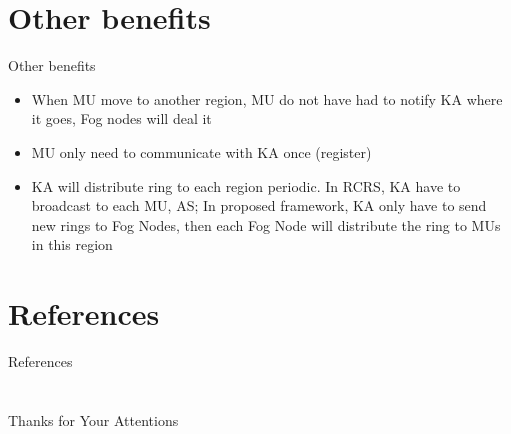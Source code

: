 \documentclass{beamer}
\begin{document}
\section{Other benefits}
\begin{frame}{Other benefits}
    \begin{itemize}
        \item {When MU move to another region, MU do not have had to notify KA where it goes, Fog nodes will deal it}
        \item {MU only need to communicate with KA once (register)}
        \item {KA will distribute ring to each region periodic. In RCRS, KA have to broadcast to each MU, AS; In proposed framework, KA only have to send new rings to Fog Nodes, then each Fog Node will distribute the ring to MUs in this region}
    \end{itemize}
\end{frame}

\section{References}
\calcreferencespagetotal %
\begin{frame}[allowframebreaks]{References}
    \fontsize{9pt}{13}\selectfont
    
    
\end{frame}

\section{}

\begin{frame}
    \centering
    \Large{Thanks for Your Attentions}
\end{frame}
\end{document}
